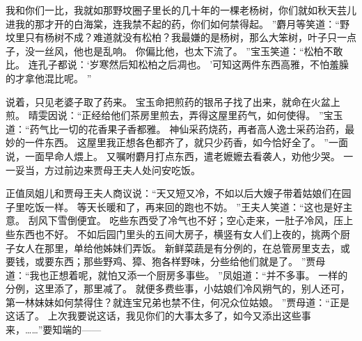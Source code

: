 我和你们一比，我就如那野坟圈子里长的几十年的一棵老杨树，你们就如秋天芸儿进我的那才开的白海棠，连我禁不起的药，你们如何禁得起。
”麝月等笑道：“野坟里只有杨树不成？难道就没有松柏？我最嫌的是杨树，那么大笨树，叶子只一点子，没一丝风，他也是乱响。
你偏比他，也太下流了。
”宝玉笑道：“松柏不敢比。
连孔子都说：‘岁寒然后知松柏之后凋也。
’可知这两件东西高雅，不怕羞臊的才拿他混比呢。
”\par
说着，只见老婆子取了药来。
宝玉命把煎药的银吊子找了出来，就命在火盆上煎。
晴雯因说：“正经给他们茶房里煎去，弄得这屋里药气，如何使得。
”宝玉道：“药气比一切的花香果子香都雅。
神仙采药烧药，再者高人逸士采药治药，最妙的一件东西。
这屋里我正想各色都齐了，就只少药香，如今恰好全了。
”一面说，一面早命人煨上。
又嘱咐麝月打点东西，遣老嬷嬷去看袭人，劝他少哭。
一一妥当，方过前边来贾母王夫人处问安吃饭。
\par
正值凤姐儿和贾母王夫人商议说：“天又短又冷，不如以后大嫂子带着姑娘们在园子里吃饭一样。
等天长暖和了，再来回的跑也不妨。
”王夫人笑道：“这也是好主意。
刮风下雪倒便宜。
吃些东西受了冷气也不好；空心走来，一肚子冷风，压上些东西也不好。
不如后园门里头的五间大房子，横竖有女人们上夜的，挑两个厨子女人在那里，单给他姊妹们弄饭。
新鲜菜蔬是有分例的，在总管房里支去，或要钱，或要东西；那些野鸡、獐、狍各样野味，分些给他们就是了。
”贾母道：“我也正想着呢，就怕又添一个厨房多事些。
”凤姐道：“并不多事。
一样的分例，这里添了，那里减了。
就便多费些事，小姑娘们冷风朔气的，别人还可，第一林妹妹如何禁得住？就连宝兄弟也禁不住，何况众位姑娘。
”贾母道：“正是这话了。
上次我要说这话，我见你们的大事太多了，如今又添出这些事来，……”要知端的——\par
{}
